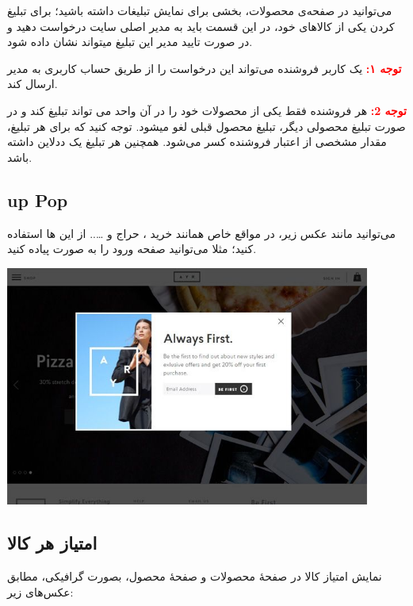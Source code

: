 \documentclass[]{article}
\begin{document}
می‌توانید در صفحه‌ی محصولات، بخشی برای نمایش تبلیغات داشته باشید؛ برای تبلیغ کردن یکی از کالاهای خود، در این قسمت باید به مدیر اصلی سایت درخواست دهید و در صورت تایید مدیر این تبلیغ میتواند نشان داده شود.

\textbf{\textcolor{red}{توجه ۱:}}
 یک کاربر فروشنده می‌تواند این درخواست را از طریق حساب کاربری به مدیر ارسال کند.

\textbf{\textcolor{red}{توجه 2:}}
هر فروشنده فقط یکی از محصولات خود را در آن واحد می تواند تبلیغ کند و در صورت تبلیغ محصولی دیگر، تبلیغ محصول قبلی لغو میشود. توجه کنید که برای هر تبلیغ، مقدار مشخصی از اعتبار فروشنده کسر می‌شود. همچنین هر تبلیغ یک ددلاین داشته باشد.

\newpage
\subsection*{{\titr up Pop  }}

می‌توانید مانند عکس زیر، در مواقع خاص همانند خرید ، حراج و ….. از این   ها استفاده کنید؛ مثلا می‌توانید صفحه ورود را به صورت  پیاده کنید.



\begin{center}
\includegraphics[width=0.9\textwidth]{images/image29.png}
\end{center}


\subsection*{{\titr امتیاز هر کالا   }}

نمایش امتیاز کالا در صفحهٔ محصولات و صفحهٔ محصول، بصورت گرافیکی، مطابق عکس‌های زیر:
\end{document}
